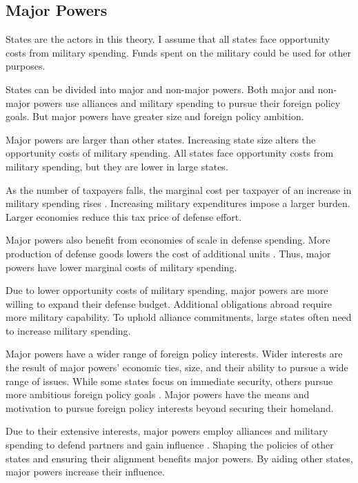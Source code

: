 \documentclass[12pt]{article}
\begin{document}
\subsection{Major Powers}


States are the actors in this theory. 
I assume that all states face opportunity costs from military spending. 
Funds spent on the military could be used for other purposes.


States can be divided into major and non-major powers. 
Both major and non-major powers use alliances and military spending to pursue their foreign policy goals. 
But major powers have greater size and foreign policy ambition. 


Major powers are larger than other states. 
Increasing state size alters the opportunity costs of military spending.  
All states face opportunity costs from military spending, but they are lower in large states.  


As the number of taxpayers falls, the marginal cost per taxpayer of an increase in military spending rises \citep{DudleyMontmarquette1981}. 
Increasing military expenditures impose a larger burden.
Larger economies reduce this tax price of defense effort. 


Major powers also benefit from economies of scale in defense spending. 
More production of defense goods lowers the cost of additional units \citep{Moravcsik1991, AlesinaSpolaore2006}. 
Thus, major powers have lower marginal costs of military spending. 


Due to lower opportunity costs of military spending, major powers are more willing to expand their defense budget. 
Additional obligations abroad require more military capability. 
To uphold alliance commitments, large states often need to increase military spending.


Major powers have a wider range of foreign policy interests.
Wider interests are the result of major powers' economic ties, size, and their ability to pursue a wide range of issues. 
While some states focus on immediate security, others pursue more ambitious foreign policy goals \citep{Fordham2011, MarkowitzFariss2017}. 
Major powers have the means and motivation to pursue foreign policy interests beyond securing their homeland. 


Due to their extensive interests, major powers employ alliances and military spending to defend partners and gain influence \citep{Morrow1991}. 
Shaping the policies of other states and ensuring their alignment benefits major powers. 
By aiding other states, major powers increase their influence. 
\end{document}
